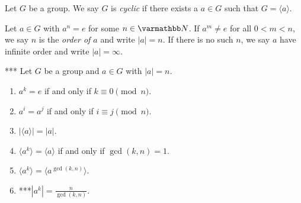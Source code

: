     \begin{definition}
        Let $G$ be a group. We say $G$ is \textit{cyclic} if there exists a $a \in G$ such that $G = \langle a \rangle$.
    \end{definition}

    \begin{definition}
        Let $a \in G$ with $a^n = e$ for some $n \in \bfN$. If $a^m \neq e$ for all $0 < m < n$, we say $n$ is the \textit{order of $a$} and write $|a| = n$. If there is no such $n$, we say $a$ have infinite order and write $|a| = \infty$.
    \end{definition}

    \begin{proposition}***\label{prop:order-properties}
        Let $G$ be a group and $a \in G$ with $|a| = n$.
            \begin{enumerate}[label = (\arabic*),itemsep=1pt,topsep=3pt]
                \item $a^k = e$ if and only if $k \equiv 0 \pmod{n}$.
                \item $a^i = a^j$ if and only if $i \equiv j \pmod{n}$.
                \item $|\langle a \rangle| = |a|$.
                \item $\langle a^k \rangle = \langle a \rangle$ if and only if $\gcd(k,n) = 1$.
                \item $\langle a^k \rangle = \langle a^{\gcd(k,n)} \rangle$.
                \item ***$|a^k| = \frac{n}{\gcd(k,n)}$.
            \end{enumerate}
    \end{proposition}
